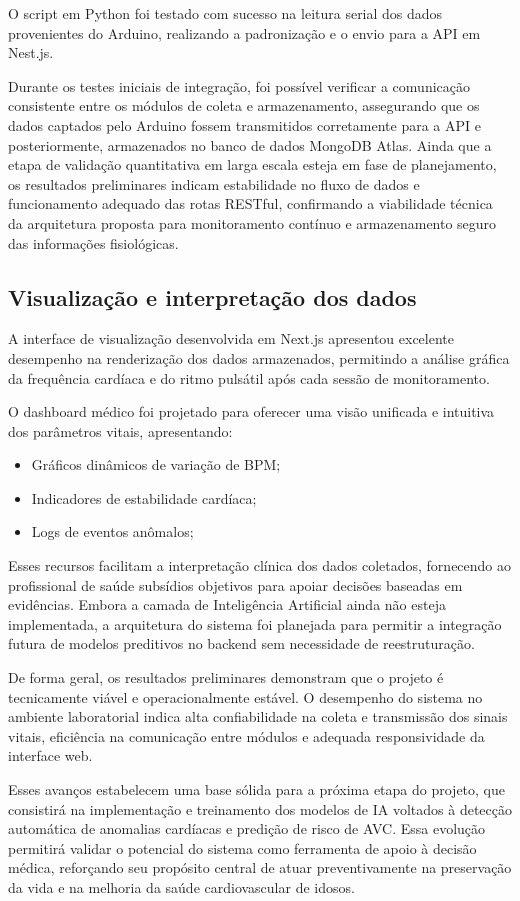 O script em Python foi testado com sucesso na leitura serial dos dados provenientes do Arduino, realizando a padronização e o envio para a API em Nest.js. 

Durante os testes iniciais de integração, foi possível verificar a comunicação consistente entre os módulos de coleta e armazenamento, assegurando que os dados captados pelo Arduino fossem transmitidos corretamente para a API e posteriormente, armazenados no banco de dados MongoDB Atlas. Ainda que a etapa de validação quantitativa em larga escala esteja em fase de planejamento, os resultados preliminares indicam estabilidade no fluxo de dados e funcionamento adequado das rotas RESTful, confirmando a viabilidade técnica da arquitetura proposta para monitoramento contínuo e armazenamento seguro das informações fisiológicas.

\subsection*{Visualização e interpretação dos dados}

A interface de visualização desenvolvida em Next.js apresentou excelente desempenho na renderização dos dados armazenados, permitindo a análise gráfica da frequência cardíaca e do ritmo pulsátil após cada sessão de monitoramento.

O dashboard médico foi projetado para oferecer uma visão unificada e intuitiva dos parâmetros vitais, apresentando:\\

\begin{itemize}[itemsep=0.5em]
    \item Gráficos dinâmicos de variação de BPM;
    \item Indicadores de estabilidade cardíaca;
    \item Logs de eventos anômalos;\\
\end{itemize}

Esses recursos facilitam a interpretação clínica dos dados coletados, fornecendo ao profissional de saúde subsídios objetivos para apoiar decisões baseadas em evidências. Embora a camada de Inteligência Artificial ainda não esteja implementada, a arquitetura do sistema foi planejada para permitir a integração futura de modelos preditivos no backend sem necessidade de reestruturação.

De forma geral, os resultados preliminares demonstram que o projeto é tecnicamente viável e operacionalmente estável. O desempenho do sistema no ambiente laboratorial indica alta confiabilidade na coleta e transmissão dos sinais vitais, eficiência na comunicação entre módulos e adequada responsividade da interface web.

Esses avanços estabelecem uma base sólida para a próxima etapa do projeto, que consistirá na implementação e treinamento dos modelos de IA voltados à detecção automática de anomalias cardíacas e predição de risco de AVC. Essa evolução permitirá validar o potencial do sistema como ferramenta de apoio à decisão médica, reforçando seu propósito central de atuar preventivamente na preservação da vida e na melhoria da saúde cardiovascular de idosos.